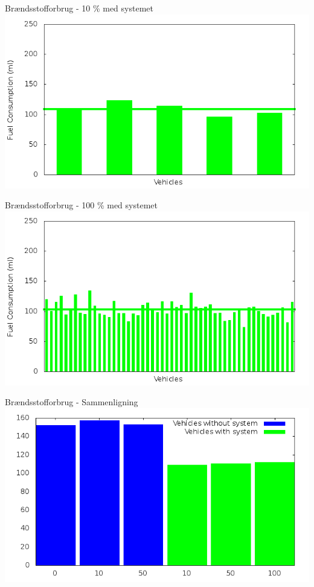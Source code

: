 \begin{frame}{Brændsstofforbrug - 10 \% med systemet}
\includegraphics[width=1\textwidth]{images/fuelRouteControlled10.png}
\end{frame}

\begin{frame}{Brændsstofforbrug - 100 \% med systemet}
\includegraphics[width=1\textwidth]{images/fuelRouteControlled100.png}
\end{frame}

\begin{frame}{Brændsstofforbrug - Sammenligning}
\includegraphics[width=1\textwidth]{images/combinedFuel.png}
\end{frame}




